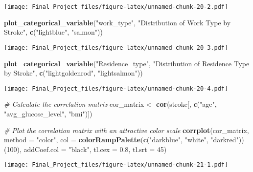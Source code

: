 \documentclass[
]{article}
\newenvironment{Shaded}{\begin{snugshade}}{\end{snugshade}}
\newcommand{\AttributeTok}[1]{\textcolor[rgb]{0.13,0.29,0.53}{#1}}
\newcommand{\CommentTok}[1]{\textcolor[rgb]{0.56,0.35,0.01}{\textit{#1}}}
\newcommand{\DecValTok}[1]{\textcolor[rgb]{0.00,0.00,0.81}{#1}}
\newcommand{\FloatTok}[1]{\textcolor[rgb]{0.00,0.00,0.81}{#1}}
\newcommand{\FunctionTok}[1]{\textcolor[rgb]{0.13,0.29,0.53}{\textbf{#1}}}
\newcommand{\NormalTok}[1]{#1}
\newcommand{\OtherTok}[1]{\textcolor[rgb]{0.56,0.35,0.01}{#1}}
\newcommand{\StringTok}[1]{\textcolor[rgb]{0.31,0.60,0.02}{#1}}
\begin{document}
\texttt{[image: Final\_Project\_files/figure-latex/unnamed-chunk-20-2.pdf]}

\begin{Shaded}
\begin{Highlighting}[]
\FunctionTok{plot\_categorical\_variable}\NormalTok{(}\StringTok{"work\_type"}\NormalTok{, }\StringTok{"Distribution of Work Type by Stroke"}\NormalTok{, }\FunctionTok{c}\NormalTok{(}\StringTok{"lightblue"}\NormalTok{, }\StringTok{"salmon"}\NormalTok{))}
\end{Highlighting}
\end{Shaded}

\texttt{[image: Final\_Project\_files/figure-latex/unnamed-chunk-20-3.pdf]}

\begin{Shaded}
\begin{Highlighting}[]
\FunctionTok{plot\_categorical\_variable}\NormalTok{(}\StringTok{"Residence\_type"}\NormalTok{, }\StringTok{"Distribution of Residence Type by Stroke"}\NormalTok{, }\FunctionTok{c}\NormalTok{(}\StringTok{"lightgoldenrod"}\NormalTok{, }\StringTok{"lightsalmon"}\NormalTok{))}
\end{Highlighting}
\end{Shaded}

\texttt{[image: Final\_Project\_files/figure-latex/unnamed-chunk-20-4.pdf]}

\begin{Shaded}
\begin{Highlighting}[]
\CommentTok{\# Calculate the correlation matrix}
\NormalTok{cor\_matrix }\OtherTok{\textless{}{-}} \FunctionTok{cor}\NormalTok{(stroke[, }\FunctionTok{c}\NormalTok{(}\StringTok{"age"}\NormalTok{, }\StringTok{"avg\_glucose\_level"}\NormalTok{, }\StringTok{"bmi"}\NormalTok{)])}

\CommentTok{\# Plot the correlation matrix with an attractive color scale}
\FunctionTok{corrplot}\NormalTok{(cor\_matrix, }\AttributeTok{method =} \StringTok{"color"}\NormalTok{, }\AttributeTok{col =} \FunctionTok{colorRampPalette}\NormalTok{(}\FunctionTok{c}\NormalTok{(}\StringTok{"darkblue"}\NormalTok{, }\StringTok{"white"}\NormalTok{, }\StringTok{"darkred"}\NormalTok{))(}\DecValTok{100}\NormalTok{), }
         \AttributeTok{addCoef.col =} \StringTok{"black"}\NormalTok{, }\AttributeTok{tl.cex =} \FloatTok{0.8}\NormalTok{, }\AttributeTok{tl.srt =} \DecValTok{45}\NormalTok{)}
\end{Highlighting}
\end{Shaded}

\texttt{[image: Final\_Project\_files/figure-latex/unnamed-chunk-21-1.pdf]}
\end{document}

